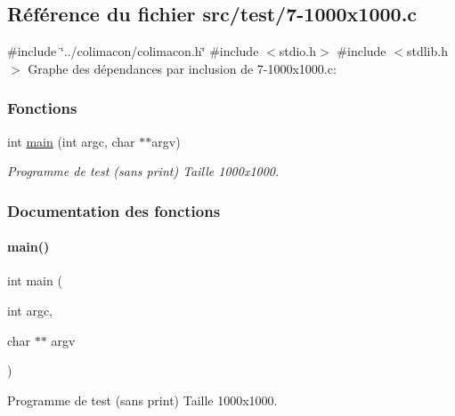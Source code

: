 \hypertarget{7-1000x1000_8c}{}\subsection{Référence du fichier src/test/7-\/1000x1000.c}
\label{7-1000x1000_8c}
{\ttfamily \#include \char`\"{}../colimacon/colimacon.\+h\char`\"{}}\newline
{\ttfamily \#include $<$stdio.\+h$>$}\newline
{\ttfamily \#include $<$stdlib.\+h$>$}\newline
Graphe des dépendances par inclusion de 7-\/1000x1000.c\+:
\subsubsection*{Fonctions}
\begin{DoxyCompactItemize}
\item 
int \hyperlink{7-1000x1000_8c_a3c04138a5bfe5d72780bb7e82a18e627}{main} (int argc, char $\ast$$\ast$argv)
\begin{DoxyCompactList}\small\item\em Programme de test (sans print) Taille 1000x1000. \end{DoxyCompactList}\end{DoxyCompactItemize}


\subsubsection{Documentation des fonctions}
\mbox{\label{7-1000x1000_8c_a3c04138a5bfe5d72780bb7e82a18e627}} 
\paragraph{\texorpdfstring{main()}{main()}}
{\footnotesize\ttfamily int main (\begin{DoxyParamCaption}\item[{int}]{argc,  }\item[{char $\ast$$\ast$}]{argv }\end{DoxyParamCaption})}



Programme de test (sans print) Taille 1000x1000. 

